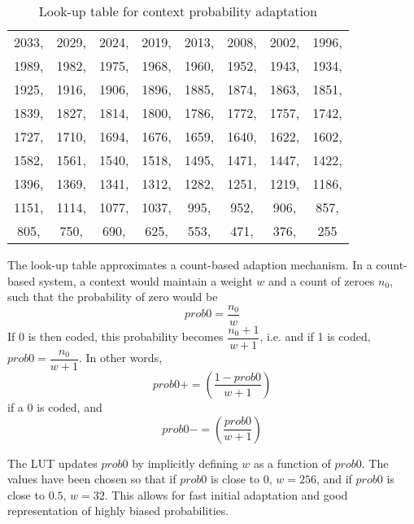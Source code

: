 \begin{table}[!ht]
\begin{tabular}{|cccccccc|}
          2033,& 2029,& 2024,& 2019,& 2013,& 2008,& 2002,& 1996,\\
          1989,& 1982,& 1975,& 1968,& 1960,& 1952,& 1943,& 1934,\\
          1925,& 1916,& 1906,& 1896,& 1885,& 1874,& 1863,& 1851,\\
          1839,& 1827,& 1814,& 1800,& 1786,& 1772,& 1757,& 1742,\\
          1727,& 1710,& 1694,& 1676,& 1659,& 1640,& 1622,& 1602,\\
          1582,& 1561,& 1540,& 1518,& 1495,& 1471,& 1447,& 1422,\\
          1396,& 1369,& 1341,& 1312,& 1282,& 1251,& 1219,& 1186,\\
          1151,& 1114,& 1077,& 1037,&  995,&  952,&  906,&  857,\\
           805,&  750,&  690,&  625,&  553,&  471,&  376,&  255\\
\hline
\end{tabular}
\caption{Look-up table for context probability adaptation}
\label{table:lut}
\end{table}

\begin{informative}
The look-up table approximates a count-based adaption mechanism. In
a count-based system, a context would maintain a weight $w$ and a
count of zeroes $n_0$, such that the probability of zero would
be
\[prob0=\dfrac{n_0}{w}\]
If 0 is then coded, this probability becomes $\dfrac{n_0+1}{w+1}$,
i.e. and if 1 is coded, $prob0=\dfrac{n_0}{w+1}$. In other words,
\[prob0+=\left(\dfrac{1-prob0}{w+1}\right)\]
if a 0 is coded, and 
\[prob0-=\left(\dfrac{prob0}{w+1}\right)\]

The LUT updates $prob0$ by implicitly defining $w$ as a function of
$prob0$. The values have been chosen so that if $prob0$ is close
to 0, $w=256$, and if $prob0$ is close to $0.5$, $w=32$. This allows
for fast initial adaptation and good representation of highly biased
probabilities. 
\end{informative}

